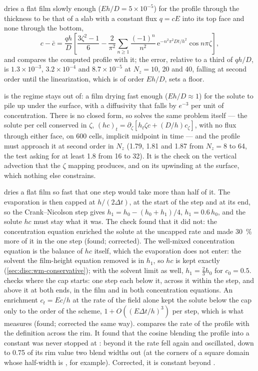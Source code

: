  dries a flat  film slowly enough ($E h/D = 5\times
10^{-5}$) for the profile through the thickness to be that of a slab with a
constant flux $q = cE$ into its top face and none through the bottom,
\begin{equation*}
  c - \bar c = \frac{q h}{D}\left[\frac{3\zeta^2 - 1}{6}
    - \frac{2}{\pi^2}\sum_{n\ge1}\frac{(-1)^n}{n^2}\,
      \mathrm{e}^{-n^2\pi^2 D t/h^2}\cos n\pi\zeta\right],
\end{equation*}
and compares the computed profile with it; the error, relative to a third of
$qh/D$, is $1.3\times10^{-3}$, $3.2\times10^{-4}$ and $8.7\times10^{-5}$ at
$N_z = 10$, 20 and 40, falling at second order until the linearization, which
is of order $Eh/D$, sets a floor.

 is the regime  stays out of: a film drying
fast enough ($Eh/D \approx 1$) for the solute to pile up under the surface,
with a diffusivity that falls by $e^{-3}$ per unit of concentration. There is
no closed form, so  solves the same problem itself
--- the solute per cell conserved in $\zeta$, $(hc)_t = \partial_\zeta[h_t\zeta c
+ (D/h)c_\zeta]$, with no flux through either face, on 600 cells, implicit
midpoint in time --- and the  profile must approach it at second
order in $N_z$ (1.79, 1.81 and 1.87 from $N_z = 8$ to 64, the test asking
for at least 1.8 from 16 to 32). It is the check on the vertical advection that the $\zeta$
mapping produces, and on its upwinding at the surface, which nothing else
constrains.

 dries a flat film so fast that one step would take more than
half of it. The evaporation is then capped at $h/(2\Delta t)$, at the start of
the step and at its end, so the Crank--Nicolson step gives $h_1 = h_0 -
(h_0 + h_1)/4$, $h_1 = 0.6\,h_0$, and the solute $hc$ must stay what it was.
The check found that it did not: the concentration equation enriched the
solute at the uncapped rate and made \SI{30}{\percent} more of it in the one
step (found; corrected). The well-mixed concentration equation is the balance
of $hc$ itself, which the evaporation does not enter: the solvent the
film-height equation removed is in $h_1$, so $hc$ is kept exactly
(\cref{sec:disc:wm-conservative}); with the solvent limit as
well, $h_1 = \tfrac23 h_0$ for $c_0 = 0.5$.  checks where the cap starts: one step each
below it, across it within the step, and above it at both ends, in the film
and in both concentration equations. An enrichment $c_t = Ec/h$ at the rate
of the field alone kept the solute below the cap only to the order of
the scheme, $1 + O((E\Delta t/h)^3)$ per step, which is what
 measures (found; corrected the same way).  compares the rate of the
 profile with the definition across the rim. It found that the
cosine blending the profile into a constant was never stopped at
: beyond it the rate fell again and oscillated, down to 0.75 of
its rim value two blend widths out (at the corners of a square domain whose
half-width is , for example). Corrected, it is constant
beyond .

